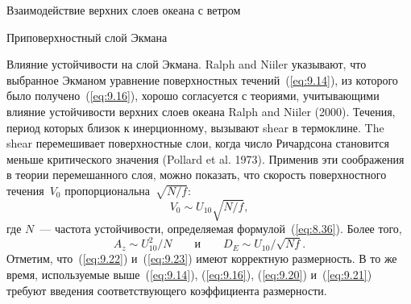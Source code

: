 \begin{chapter}{Взаимодействие верхних слоев океана с ветром}
\begin{section}{Приповерхностный слой Экмана}
\begin{paragraph}{Влияние устойчивости на слой Экмана.}
Ralph and Niiler
указывают, что выбранное Экманом уравнение поверхностных 
течений~(\ref{eq:9.14}), из которого было получено~(\ref{eq:9.16}), 
хорошо согласуется с теориями, учитывающими влияние устойчивости верхних 
слоев океана Ralph and Niiler (2000).
Течения, период которых близок к инерционному, 
вызывают shear в термоклине. 
The shear перемешивает поверхностные слои, когда число Ричардсона становится
меньше критического значения (Pollard et al. 1973). 
Применив эти соображения в теории перемешанного слоя, можно показать, что
скорость поверхностного течения~$V_0$ пропорциональна~$\sqrt{N/f}$:
\begin{equation}\label{eq:9.22}
 V_0 \sim U_{10}  \sqrt{N/f},
\end{equation}
где $N$~--- частота устойчивости, определяемая формулой~(\ref{eq:8.36}). 
Более того,
\begin{equation}\label{eq:9.23}
 A_z \sim U_{10}^2 / N \qquad \text{и} \qquad D_E \sim U_{10} / \sqrt{Nf}.
\end{equation}
Отметим, что~(\ref{eq:9.22}) и~(\ref{eq:9.23}) имеют корректную размерность.
В то же время, используемые выше~(\ref{eq:9.14}), (\ref{eq:9.16}), 
(\ref{eq:9.20}) и~(\ref{eq:9.21}) требуют введения соответствующего 
коэффициента размерности.
%
\end{paragraph}
\end{section}


\end{chapter}
